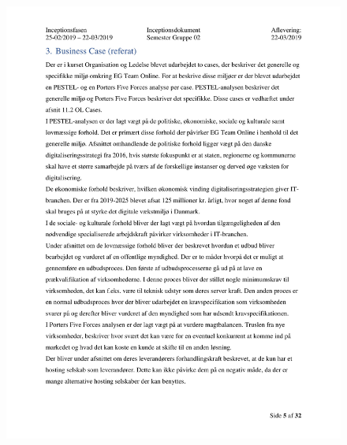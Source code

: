 \begin{figure}[hb]
  \includegraphics[scale = 0.33]{./PNG/Inceptions/Gruppe 02 + InceptionsDokument-06.jpg} 
\end{figure}

